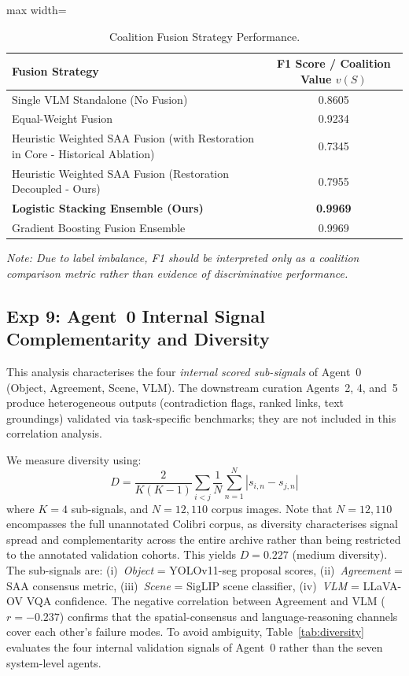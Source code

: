 \documentclass[11pt,a4paper]{article}
\begin{document}
\begin{table}[htbp]
\centering
\caption{Coalition Fusion Strategy Performance.}
\label{tab:coalition_fusion}
\begin{adjustbox}{max width=\linewidth}
\begin{tabular}{lc}
\toprule
\textbf{Fusion Strategy} & \textbf{F1 Score / Coalition Value $v(S)$} \\
\midrule
Single VLM Standalone (No Fusion) & 0.8605 \\
Equal-Weight Fusion & 0.9234 \\
Heuristic Weighted SAA Fusion (with Restoration in Core - Historical Ablation) & 0.7345 \\
Heuristic Weighted SAA Fusion (Restoration Decoupled - Ours) & 0.7955 \\
\textbf{Logistic Stacking Ensemble (Ours)} & \textbf{0.9969} \\
Gradient Boosting Fusion Ensemble & 0.9969 \\
\bottomrule
\end{tabular}
\end{adjustbox}
\begin{flushleft}
\small{\textit{Note: Due to label imbalance, F1 should be interpreted only as a coalition comparison metric rather than evidence of discriminative performance.}}
\end{flushleft}
\end{table}

\newpage
\subsection{Exp 9: Agent~0 Internal Signal Complementarity and Diversity}\label{sec:diversity}
 This analysis characterises the four \emph{internal scored sub-signals} of Agent~0 (Object, Agreement, Scene, VLM). The downstream curation Agents~2, 4, and~5 produce heterogeneous outputs (contradiction flags, ranked links, text groundings) validated via task-specific benchmarks; they are not included in this correlation analysis.

We measure diversity using:
$$ D = \frac{2}{K(K-1)} \sum_{i < j} \frac{1}{N} \sum_{n=1}^N |s_{i,n} - s_{j,n}| $$
where $K=4$ sub-signals, and $N=12{,}110$ corpus images. Note that $N=12,110$ encompasses the full unannotated Colibri corpus, as diversity characterises signal spread and complementarity across the entire archive rather than being restricted to the annotated validation cohorts. This yields $D = 0.227$ (medium diversity). The sub-signals are: (i)~\textit{Object} = YOLOv11-seg proposal scores, (ii)~\textit{Agreement} = SAA consensus metric, (iii)~\textit{Scene} = SigLIP scene classifier, (iv)~\textit{VLM} = LLaVA-OV VQA confidence. The negative correlation between Agreement and VLM ($r=-0.237$) confirms that the spatial-consensus and language-reasoning channels cover each other's failure modes. To avoid ambiguity, Table~\ref{tab:diversity} evaluates the four internal validation signals of Agent~0 rather than the seven system-level agents.
\end{document}
